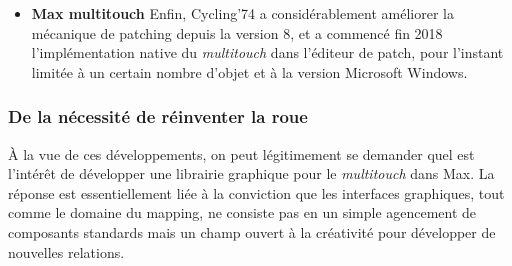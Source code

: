 \begin{itemize}[noitemsep]
	\item \textbf{Max multitouch} Enfin, Cycling'74 a considérablement améliorer la mécanique de patching depuis la version 8, et a commencé fin 2018 l'implémentation native du \textit{multitouch} dans l'éditeur de patch, pour l'instant limitée à un certain nombre d'objet et à la version Microsoft Windows.
\end{itemize}

\subsubsection{De la nécessité de réinventer la roue} 

\noindent À la vue de ces développements, on peut légitimement se demander quel est l'intérêt de développer une librairie graphique pour le \textit{multitouch} dans Max. La réponse est essentiellement liée à la conviction que les interfaces graphiques, tout comme le domaine du mapping, ne consiste pas en un simple agencement de composants standards mais un champ ouvert à la créativité pour développer de nouvelles relations. \\
